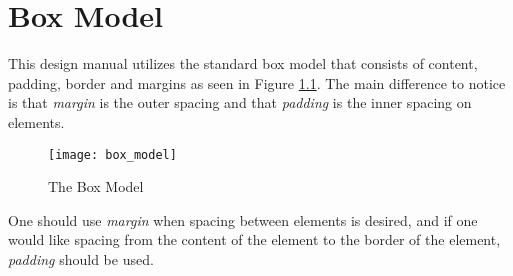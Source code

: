 \chapter{Box Model}
\label{cha:box_model}

This design manual utilizes the standard box model that consists of content, padding, border and margins as seen in Figure \ref{fig:box_model}. The main difference to notice is that \emph{margin} is the outer spacing and that \emph{padding} is the inner spacing on elements. 

\begin{figure}[h]
	\centering
	\texttt{[image: box\_model]}
	\caption{The Box Model}
	\label{fig:box_model}
\end{figure}

One should use \emph{margin} when spacing between elements is desired, and if one would like spacing from the content of the element to the border of the element, \emph{padding} should be used.

